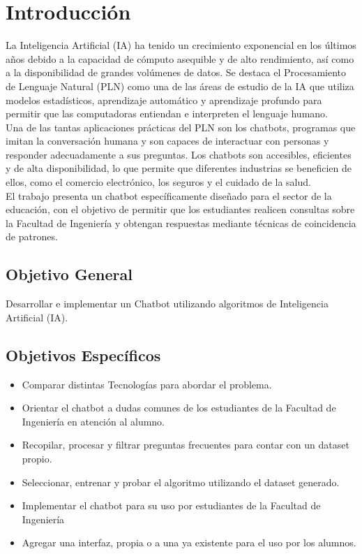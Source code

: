 \section{Introducción}
La Inteligencia Artificial (IA) ha tenido un crecimiento exponencial en los últimos años debido a la capacidad de cómputo asequible y de alto rendimiento, así como a la disponibilidad de grandes volúmenes de datos. Se destaca el Procesamiento de Lenguaje Natural (PLN) como una de las áreas de estudio de la IA que utiliza modelos estadísticos, aprendizaje automático y aprendizaje profundo para permitir que las computadoras entiendan e interpreten el lenguaje humano.\\
\indent Una de las tantas aplicaciones prácticas del PLN son los chatbots, programas que imitan la conversación humana y son capaces de interactuar con personas y responder adecuadamente a sus preguntas. Los chatbots son accesibles, eficientes y de alta disponibilidad, lo que permite que diferentes industrias se beneficien de ellos, como el comercio electrónico, los seguros y el cuidado de la salud.\\
\indent El trabajo presenta un chatbot específicamente diseñado para el sector de la educación, con el objetivo de permitir que los estudiantes realicen consultas sobre la Facultad de Ingeniería y obtengan respuestas mediante técnicas de coincidencia de patrones.

\subsection{Objetivo General}

Desarrollar e implementar un Chatbot utilizando algoritmos de Inteligencia Artificial (IA).

\subsection{Objetivos Específicos}
\begin{itemize}
\item Comparar distintas Tecnologías para abordar el problema.
\item Orientar el chatbot a dudas comunes de los estudiantes de la Facultad de Ingeniería en atención al alumno.
\item Recopilar, procesar y filtrar preguntas frecuentes para contar con un dataset
propio.
\item Seleccionar, entrenar y probar el algoritmo utilizando el dataset generado.
\item Implementar el chatbot para su uso por estudiantes de la Facultad de Ingeniería
\item Agregar una interfaz, propia o a una ya existente para el uso por los alumnos.

\end{itemize}

